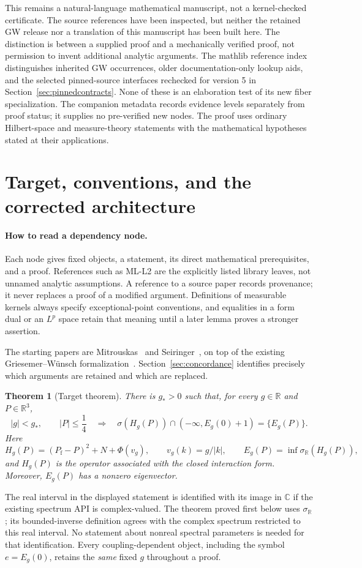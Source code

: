 \documentclass[11pt,a4paper]{article}
\newtheorem{theorem}{Theorem}[section]
\theoremstyle{remark}\newtheorem{remark}[theorem]{Remark}
\newcommand{\R}{\mathbb R}\newcommand{\C}{\mathbb C}\newcommand{\N}{\mathbb N}
\newcommand{\Pf}{P_{\mathrm f}}\newcommand{\Id}{I}\newcommand{\Dom}{\operatorname{Dom}}
\newcommand{\abs}[1]{\lvert #1\rvert}\newcommand{\rankone}[2]{\lvert #1\rangle\langle #2\rvert}
\newcommand{\sigR}{\sigma_{\R}}
\begin{document}
This remains a natural-language mathematical manuscript, not a kernel-checked certificate. The source references have been inspected, but neither the retained GW release nor a translation of this manuscript has been built here. The distinction is between a supplied proof and a mechanically verified proof, not permission to invent additional analytic arguments. The mathlib reference index distinguishes inherited GW occurrences, older documentation-only lookup aids, and the selected pinned-source interfaces rechecked for version 5 in Section~\ref{sec:pinnedcontracts}. None of these is an elaboration test of its new fiber specialization. The companion metadata records evidence levels separately from proof status; it supplies no pre-verified new nodes. The proof uses ordinary Hilbert-space and measure-theory statements with the mathematical hypotheses stated at their applications.

\clearpage
\tableofcontents
\newpage

\section{Target, conventions, and the corrected architecture}\label{sec:target}
\paragraph{How to read a dependency node.}
Each node gives fixed objects, a statement, its direct mathematical prerequisites, and a proof. References such as ML-L2 are the explicitly listed library leaves, not unnamed analytic assumptions. A reference to a source paper records provenance; it never replaces a proof of a modified argument. Definitions of measurable kernels always specify exceptional-point conventions, and equalities in a form dual or an $L^p$ space retain that meaning until a later lemma proves a stronger assertion.


The starting papers are Mitrouskas~\cite{mitrouskas} and Seiringer~\cite{seiringer}, on top of the existing Griesemer--W\"unsch formalization~\cite{gw}. Section~\ref{sec:concordance} identifies precisely which arguments are retained and which are replaced.
\begin{theorem}[Target theorem]\label{thm:target}
There is $g_*>0$ such that, for every $g\in\R$ and $P\in\R^3$,
\[
 \abs g<g_*,\qquad \abs P\leq\frac14
 \quad\Longrightarrow\quad
 \sigma(H_g(P))\cap(-\infty,E_g(0)+1)=\{E_g(P)\}.
\]
Here
\[
 H_g(P)=(\Pf-P)^2+N+\Phi(v_g),\qquad v_g(k)=g/\abs k,
 \qquad E_g(P)=\inf\sigR(H_g(P)),
\]
and $H_g(P)$ is the operator associated with the closed interaction form. Moreover, $E_g(P)$ has a nonzero eigenvector.
\end{theorem}
The real interval in the displayed statement is identified with its image in $\C$ if the existing spectrum API is complex-valued. The theorem proved first below uses $\sigR$; its bounded-inverse definition agrees with the complex spectrum restricted to this real interval. No statement about nonreal spectral parameters is needed for that identification. Every coupling-dependent object, including the symbol $e=E_g(0)$, retains the \emph{same} fixed $g$ throughout a proof.
\end{document}

